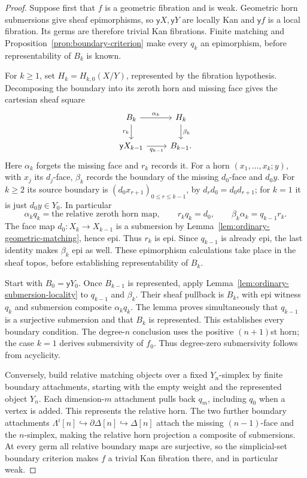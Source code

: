 \documentclass[12pt]{amsart}
\theoremstyle{definition}
\theoremstyle{remark}
\numberwithin{equation}{section}
\newcommand{\y}{\mathsf y}
\begin{document}
\begin{proof}
Suppose first that $f$ is a geometric fibration and is weak.
Geometric horn submersions give sheaf epimorphisms, so
$\y X,\y Y$ are locally Kan and $\y f$ is a local
fibration. Its germs are therefore trivial Kan fibrations.
Finite matching and Proposition~\ref{prop:boundary-criterion}
make every $q_k$ an epimorphism, before representability
of $B_k$ is known.

For $k\ge1$, set $H_k=H_{k,0}(X/Y)$, represented by the
fibration hypothesis. Decomposing the boundary into its
zeroth horn and missing face gives the cartesian sheaf square
\[
\begin{tikzcd}
 B_k\arrow[r,"\alpha_k"]\arrow[d,"r_k"']
   &H_k\arrow[d,"\beta_k"]\\
 \y X_{k-1}\arrow[r,"q_{k-1}"']
   &B_{k-1}.
\end{tikzcd}
\]
Here $\alpha_k$ forgets the missing face and $r_k$ records
it. For a horn $(x_1,\ldots,x_k;y)$, with $x_j$ its
$d_j$-face, $\beta_k$ records the boundary of the missing
$d_0$-face and $d_0y$. For $k\ge2$ its source boundary is
$(d_0x_{r+1})_{0\le r\le k-1}$, by
$d_r d_0=d_0d_{r+1}$; for $k=1$ it is just $d_0y\in Y_0$.
In particular
\[
 \alpha_kq_k=\text{the relative zeroth horn map},
 \qquad r_kq_k=d_0,\qquad
 \beta_k\alpha_k=q_{k-1}r_k.
\]
The face map $d_0:X_k\to X_{k-1}$ is a submersion by
Lemma~\ref{lem:ordinary-geometric-matching}, hence epi.
Thus $r_k$ is epi. Since $q_{k-1}$ is already epi,
the last identity makes $\beta_k$ epi as well.
These epimorphism calculations take place in the sheaf topos,
before establishing representability of $B_k$.

Start with $B_0=\y Y_0$. Once $B_{k-1}$ is represented,
apply Lemma~\ref{lem:ordinary-submersion-locality} to
$q_{k-1}$ and $\beta_k$. Their sheaf pullback is $B_k$,
with epi witness $q_k$ and submersion composite
$\alpha_kq_k$. The lemma proves simultaneously that
$q_{k-1}$ is a surjective submersion and that $B_k$
is represented. This establishes every boundary condition.
The degree-$n$ conclusion uses the positive $(n+1)$st
horn; the case $k=1$ derives submersivity of $f_0$.
Thus degree-zero submersivity follows from acyclicity.

Conversely, build relative matching objects over a fixed
$Y_n$-simplex by finite boundary attachments, starting
with the empty weight and the represented object $Y_n$.
Each dimension-$m$ attachment pulls back $q_m$, including
$q_0$ when a vertex is added. This represents the relative
horn. The two further boundary attachments
$\Lambda^i[n]\hookrightarrow\partial\Delta[n]
\hookrightarrow\Delta[n]$ attach the missing
$(n-1)$-face and the $n$-simplex, making the relative
horn projection a composite of submersions.
At every germ all relative boundary maps are surjective,
so the simplicial-set boundary criterion makes $f$ a
trivial Kan fibration there, and in particular weak.
\end{proof}
\end{document}
